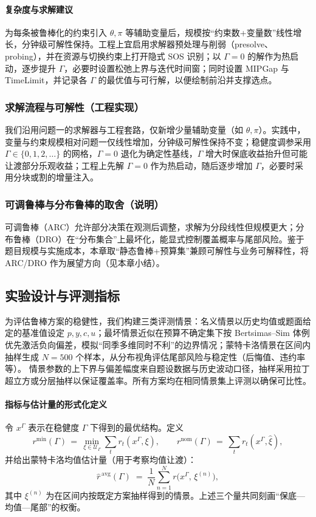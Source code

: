 \paragraph{复杂度与求解建议}
为每条被鲁棒化的约束引入 $\theta,\pi$ 等辅助变量后，规模按“约束数+变量数”线性增长，分钟级可解性保持。工程上宜启用求解器预处理与削弱（presolve、probing），并在资源与切换约束上打开隐式 SOS 识别；以 $\Gamma=0$ 的解作为热启动，逐步提升 $\Gamma$，必要时设置松弛上界与迭代时间窗；同时设置 MIPGap 与 TimeLimit，并记录各 $\Gamma$ 的最优值与可行解，以便绘制前沿并支撑选点。

\subsubsection{求解流程与可解性（工程实现）}
我们沿用问题一的求解器与工程套路，仅新增少量辅助变量（如 $\theta,\pi$）。实践中，变量与约束规模相对问题一仅线性增加，分钟级可解性保持不变；稳健度调参采用 $\Gamma\in\{0,1,2,\ldots\}$ 的网格，$\Gamma=0$ 退化为确定性基线，$\Gamma$ 增大时保底收益抬升但可能让渡部分乐观收益；工程上先解 $\Gamma=0$ 作为热启动，随后逐步增加 $\Gamma$，必要时采用分块或割的增量注入。

\subsubsection{可调鲁棒与分布鲁棒的取舍（说明）}
可调鲁棒（ARC）\cite{ben2004adjustable}允许部分决策在观测后调整，求解为分段线性但规模更大；分布鲁棒（DRO）\cite{rahimian2019distributionally}在“分布集合”上最坏化，能显式控制覆盖概率与尾部风险。鉴于题目规模与实施成本，本章取“静态鲁棒+预算集”兼顾可解性与业务可解释性，将 ARC/DRO 作为展望方向（见本章小结）。

\subsection{实验设计与评测指标}
为评估鲁棒方案的稳健性，我们构建三类评测情景：名义情景以历史均值或题面给定的基准值设定 $p,y,c,u$；最坏情景近似在预算不确定集下按 Bertsimas–Sim 体例优先激活负向偏差，模拟“同季多维同时不利”的边界情况；蒙特卡洛情景在区间内抽样生成 $N=500$ 个样本，从分布视角评估尾部风险与稳定性（后悔值、违约率等）。
情景参数的上下界与偏差幅度来自题设数据与历史波动口径，抽样采用拉丁超立方或分层抽样以保证覆盖率。所有方案均在相同情景集上评测以确保可比性。

\paragraph{指标与估计量的形式化定义}
令 $x^\Gamma$ 表示在稳健度 $\Gamma$ 下得到的最优结构。定义
\begin{equation}
  r^{\min}(\Gamma) \,=\, \min_{\xi\in\mathcal U_\Gamma} \sum_{t} r_t(x^\Gamma,\xi),\qquad
  r^{\mathrm{nom}}(\Gamma) \,=\, \sum_t r_t(x^\Gamma,\hat\xi),\label{def:model2-rmin-rnom}
\end{equation}
并给出蒙特卡洛均值估计量（用于考察均值让渡）：
\begin{equation}
  \widehat r^{\,\mathrm{avg}}(\Gamma) \;=\; \frac{1}{N}\sum_{n=1}^N r\bigl(x^\Gamma,\,\xi^{(n)}\bigr),\label{def:model2-ravg}
\end{equation}
其中 $\xi^{(n)}$ 为在区间内按既定方案抽样得到的情景。上述三个量共同刻画“保底—均值—尾部”的权衡。

